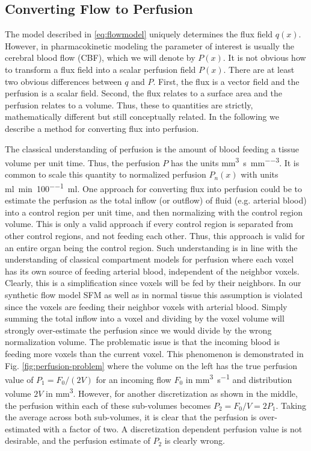 \documentclass[paper=a4, fontsize=12pt,parskip=half,headings=small]{scrartcl}
\newcommand{\siqt}{\cubic\milli\meter\per\second}
\newcommand{\siP}{\cubic\milli\meter\per\second\per\cubic\milli\meter}
\newcommand{\siPn}{\milli\litre\per\minute\per100\milli\litre}
\begin{document}
	
	\subsection{Converting Flow to Perfusion}\label{sec:flux2perf}
	The model described in \eqref{eq:flowmodel} uniquely determines the flux field $q(x)$. 
	However, in pharmacokinetic modeling the parameter of interest is usually the cerebral blood flow (CBF), which we will denote by $P(x)$.
	It is not obvious how to transform a flux field into a scalar perfusion field $P(x)$.
	There are at least two obvious differences between $q$ and $P$. 
	First, the flux is a vector field and the perfusion is a scalar field. 
	Second, the flux relates to a surface area and the perfusion relates to a volume. 
	Thus, these to quantities are strictly, mathematically different but still conceptually related. 
	In the following we describe a method for converting flux into perfusion.

	The classical understanding of perfusion is the amount of blood feeding a tissue volume per unit time. 
	Thus, the perfusion $P$ has the units \si{\siP}.
	It is common to scale this quantity to normalized perfusion $P_n(x)$ with units \si{\siPn}. 
	One approach for converting flux into perfusion could be to estimate the perfusion as the total inflow (or outflow) of fluid (e.g. arterial blood) into a control region per unit time, and then normalizing with the control region volume. 
	This is only a valid approach if every control region is separated from other control regions, and not feeding each other. 
	Thus, this approach is valid for an entire organ being the control region. 
	Such understanding is in line with the understanding of classical compartment models for perfusion where each voxel has its own source of feeding arterial blood, independent of the neighbor voxels. 
	Clearly, this is a simplification since voxels will be fed by their neighbors. 
	In our synthetic flow model SFM as well as in normal tissue this assumption is violated since the voxels are feeding their neighbor voxels with arterial blood. 
	Simply summing the total inflow into a voxel and dividing by the voxel volume will strongly over-estimate the perfusion since we would divide by the wrong normalization volume. 
	The problematic issue is that the incoming blood is feeding more voxels than the current voxel. 
	This phenomenon is demonstrated in Fig. \ref{fig:perfusion-problem} where the volume on the left has the true perfusion value of $P_1 = F_0/(2V)$ for an incoming flow $F_0$ in \si{\siqt} and distribution volume $2V$ in \si{\cubic\milli\meter}. 
	However, for another discretization as shown in the middle, the perfusion within each of these sub-volumes becomes $P_2 = F_0/V = 2P_1$. 
	Taking the average across both sub-volumes, it is clear that the perfusion is over-estimated with a factor of two. 
	A discretization dependent perfusion value is not desirable, and the perfusion estimate of $P_2$ is clearly wrong. 
\end{document}
